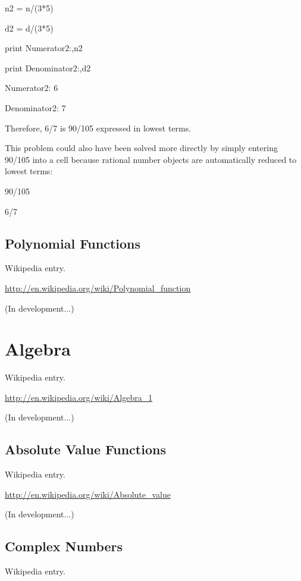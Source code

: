 \documentclass[12pt,twoside]{book}
\begin{document}
n2 = n/(3*5)

d2 = d/(3*5)

print {\textquotedbl}Numerator2:{\textquotedbl},n2

print {\textquotedbl}Denominator2:{\textquotedbl},d2

{\textbar}

Numerator2: 6

Denominator2: 7


\bigskip

{\textquotedbl}{\textquotedbl}{\textquotedbl}

Therefore, 6/7 is 90/105 expressed in lowest terms.


\bigskip

This problem could also have been solved more directly by simply
entering 90/105 into a cell because rational number objects are
automatically reduced to lowest terms:

{\textquotedbl}{\textquotedbl}{\textquotedbl}

90/105

{\textbar}

6/7

\subsection[Polynomial Functions]{Polynomial
Functions}
Wikipedia entry.

\href{http://en.wikipedia.org/wiki/Polynomial_function}{http://en.wikipedia.org/wiki/Polynomial\_function}

(In development...)

\section[Algebra]{Algebra}
Wikipedia entry.

\href{http://en.wikipedia.org/wiki/Algebra_1}{http://en.wikipedia.org/wiki/Algebra\_1}

(In development...)

\subsection[Absolute Value Functions]{Absolute Value
Functions}
Wikipedia entry.

\href{http://en.wikipedia.org/wiki/Absolute_value}{http://en.wikipedia.org/wiki/Absolute\_value}

(In development...)

\subsection[Complex Numbers]{Complex Numbers}
Wikipedia entry.
\end{document}

